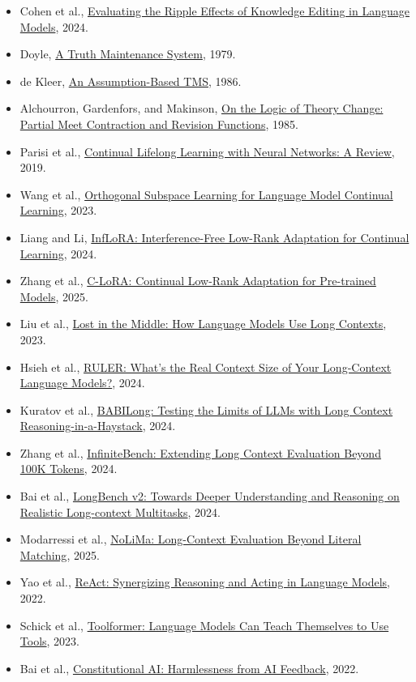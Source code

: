 \documentclass[12pt,a4paper]{article}
\begin{document}
\begin{itemize}
\item
  Cohen et al., \href{https://aclanthology.org/2024.tacl-1.16/}{Evaluating the Ripple Effects of Knowledge Editing in Language Models}, 2024.
\item
  Doyle, \href{https://www.sciencedirect.com/science/article/pii/0004370279900080}{A Truth Maintenance System}, 1979.
\item
  de Kleer, \href{https://www.dekleer.org/Publications/An\%20Assumption-Based\%20TMS.pdf}{An Assumption-Based TMS}, 1986.
\item
  Alchourron, Gardenfors, and Makinson, \href{https://www.cambridge.org/core/journals/journal-of-symbolic-logic/article/on-the-logic-of-theory-change-partial-meet-contraction-and-revision-functions/7ED837BAD5FB6D9A7C77906D73527F9C}{On the Logic of Theory Change: Partial Meet Contraction and Revision Functions}, 1985.
\item
  Parisi et al., \href{https://arxiv.org/abs/1802.07569}{Continual Lifelong Learning with Neural Networks: A Review}, 2019.
\item
  Wang et al., \href{https://openreview.net/forum?id=L7ZBpZZ8Va}{Orthogonal Subspace Learning for Language Model Continual Learning}, 2023.
\item
  Liang and Li, \href{https://arxiv.org/abs/2404.00228}{InfLoRA: Interference-Free Low-Rank Adaptation for Continual Learning}, 2024.
\item
  Zhang et al., \href{https://arxiv.org/abs/2502.17920}{C-LoRA: Continual Low-Rank Adaptation for Pre-trained Models}, 2025.
\item
  Liu et al., \href{https://arxiv.org/abs/2307.03172}{Lost in the Middle: How Language Models Use Long Contexts}, 2023.
\item
  Hsieh et al., \href{https://arxiv.org/abs/2404.06654}{RULER: What's the Real Context Size of Your Long-Context Language Models?}, 2024.
\item
  Kuratov et al., \href{https://arxiv.org/abs/2406.10149}{BABILong: Testing the Limits of LLMs with Long Context Reasoning-in-a-Haystack}, 2024.
\item
  Zhang et al., \href{https://arxiv.org/abs/2402.13718}{InfiniteBench: Extending Long Context Evaluation Beyond 100K Tokens}, 2024.
\item
  Bai et al., \href{https://arxiv.org/abs/2412.15204}{LongBench v2: Towards Deeper Understanding and Reasoning on Realistic Long-context Multitasks}, 2024.
\item
  Modarressi et al., \href{https://arxiv.org/abs/2502.05167}{NoLiMa: Long-Context Evaluation Beyond Literal Matching}, 2025.
\item
  Yao et al., \href{https://arxiv.org/abs/2210.03629}{ReAct: Synergizing Reasoning and Acting in Language Models}, 2022.
\item
  Schick et al., \href{https://arxiv.org/abs/2302.04761}{Toolformer: Language Models Can Teach Themselves to Use Tools}, 2023.
\item
  Bai et al., \href{https://arxiv.org/abs/2212.08073}{Constitutional AI: Harmlessness from AI Feedback}, 2022.
\end{itemize}
\end{document}
